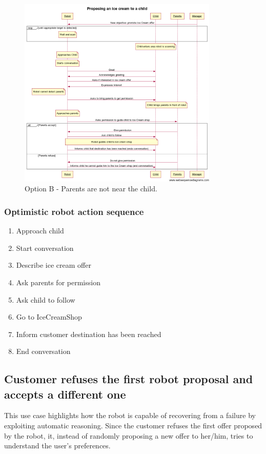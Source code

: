 \begin{figure}[!h]
\includegraphics[width=0.85\textwidth]{iceCreamB}
\protect\caption{Option B - Parents are not near the child.}
\end{figure}



\subsubsection{Optimistic robot action sequence}
\begin{enumerate}
\item Approach child
\item Start conversation
\item Describe ice cream offer
\item Ask parents for permission
\item Ask child to follow
\item Go to IceCreamShop
\item Inform customer destination has been reached
\item End conversation
\end{enumerate}

\newpage

\subsection{Customer refuses the first robot proposal and accepts a different one}

This use case highlights how the robot is capable of
recovering from a failure by exploiting automatic reasoning.
Since the customer refuses the first offer proposed by the robot, it, instead of randomly proposing 
a new offer to her/him, tries to understand the user's preferences.

